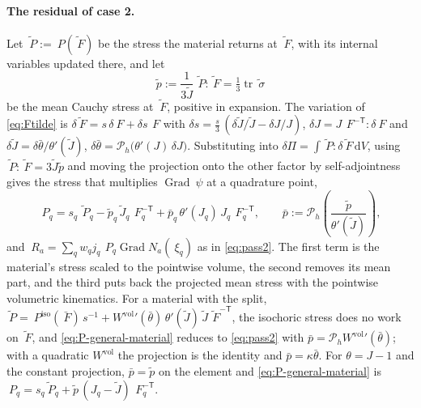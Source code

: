 \documentclass[11pt]{article}
\newcommand{\F}{~F}
\renewcommand{\P}{~P}
\newcommand{\testd}{~\psi}
\newcommand{\Grad}{\operatorname{Grad}}
\newcommand{\trace}{\operatorname{tr}}
\newcommand{\diff}{\,\mathrm{d}}
\newcommand{\supvol}{^{\mathrm{vol}}}
\newcommand{\supiso}{^{\mathrm{iso}}}
\theoremstyle{definition}
\theoremstyle{plain}
\begin{document}
\paragraph{The residual of case 2.} Let $\tilde{\P} := \P(\tilde{\F})$ be
the stress the material returns at $\tilde{\F}$, with its internal
variables updated there, and let
\begin{equation}
  \label{eq:ptilde}
  \tilde p := \frac{1}{3\tilde J}\, \tilde{\P} : \tilde{\F} = \tfrac13 \trace \tilde{~\sigma}
\end{equation}
be the mean Cauchy stress at $\tilde{\F}$, positive in expansion. The
variation of \eqref{eq:Ftilde} is $\delta\tilde{\F} = s\,\delta\F +
\delta s\,\F$ with $\delta s = \tfrac{s}{3}\,(\delta\tilde J/\tilde J -
\delta J/J)$, $\delta J = J\,\F^{-\mathsf T} : \delta\F$ and
$\delta\tilde J = \delta\bar\theta / \theta'(\tilde J)$, $\delta\bar\theta =
\mathcal{P}_h\big(\theta'(J)\,\delta J\big)$. Substituting into $\delta\Pi
= \int \tilde{\P} : \delta\tilde{\F} \diff V$, using $\tilde{\P} :
\tilde{\F} = 3\tilde J \tilde p$ and moving the projection onto the other
factor by self-adjointness gives the stress that multiplies $\Grad\testd$
at a quadrature point,
\begin{equation}
  \label{eq:P-general-material}
  \P_q = s_q\, \tilde{\P}_q
       - \tilde p_q\, \tilde J_q\, \F_q^{-\mathsf T}
       + \bar p_q\, \theta'(J_q)\, J_q\, \F_q^{-\mathsf T},
  \qquad
  \bar p := \mathcal{P}_h\!\left( \frac{\tilde p}{\theta'(\tilde J)} \right) ,
\end{equation}
and $~R_a = \sum_q w_q j_q\, \P_q \Grad N_a(~\xi_q)$ as in
\eqref{eq:pass2}. The first term is the material's stress scaled to the
pointwise volume, the second removes its mean part, and the third puts back
the projected mean stress with the pointwise volumetric kinematics. For a
material with the split, $\tilde{\P} = \P\supiso(\bar{\F})\,s^{-1} +
W\supvol{}'(\bar\theta)\,\theta'(\tilde J)\,\tilde J\,\tilde{\F}^{-\mathsf T}$,
the isochoric stress does no work on $\tilde{\F}$, and
\eqref{eq:P-general-material} reduces to \eqref{eq:pass2} with $\bar p =
\mathcal{P}_h W\supvol{}'(\bar\theta)$; with a quadratic $W\supvol$ the
projection is the identity and $\bar p = \kappa\bar\theta$. For
$\theta = J - 1$ and the constant projection, $\bar p = \tilde p$ on the
element and \eqref{eq:P-general-material} is $\P_q = s_q \tilde{\P}_q +
\tilde p\,(J_q - \tilde J)\,\F_q^{-\mathsf T}$.
\end{document}
